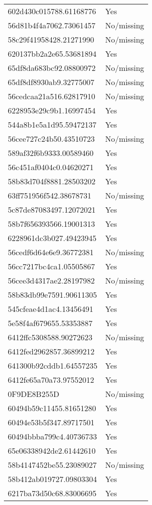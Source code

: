 \begin{tabular}{ll}
602d430c015788.61168776 & Yes \\
56d81b4f4a7062.73061457 & No/missing \\
58c29f41958428.21271990 & No/missing \\
620137bb2a2e65.53681894 & Yes \\
65df8da683bc92.08800972 & No/missing \\
65df8df8930ab9.32775007 & No/missing \\
56cedcaa21a516.62817910 & No/missing \\
6228953e29c9b1.16997454 & Yes \\
544a8b1e5a1d95.59472137 & Yes \\
56cee727c24b50.43510723 & No/missing \\
589af32f6b9333.00589460 & Yes \\
56c451af0404c0.04620271 & Yes \\
58b83d704f8881.28503202 & Yes \\
63ff751956f542.38678731 & No/missing \\
5c87de87083497.12072021 & Yes \\
58b7f656393566.19001313 & Yes \\
6228961dc3b027.49423945 & Yes \\
56cedf6d64e6e9.36772381 & No/missing \\
56cc7217bc4ca1.05505867 & Yes \\
56cee3d4317ae2.28197982 & No/missing \\
58b83db99e7591.90611305 & Yes \\
545cfeae4d1ac4.13456491 & Yes \\
5e58f4af679655.53353887 & Yes \\
6412ffc5308588.90272623 & No/missing \\
6412fed2962857.36899212 & Yes \\
641300b92cddb1.64557235 & Yes \\
6412fe65a70a73.97552012 & Yes \\
0F9DE8B255D & No/missing \\
60494b59c11455.81651280 & Yes \\
60494e53b5f347.89717501 & Yes \\
60494bbba799c4.40736733 & Yes \\
65e06338942de2.61442610 & Yes \\
58b4147452be55.23089027 & No/missing \\
58b412ab019727.09803304 & Yes \\
6217ba73d50c68.83006695 & Yes \\

\end{tabular}
